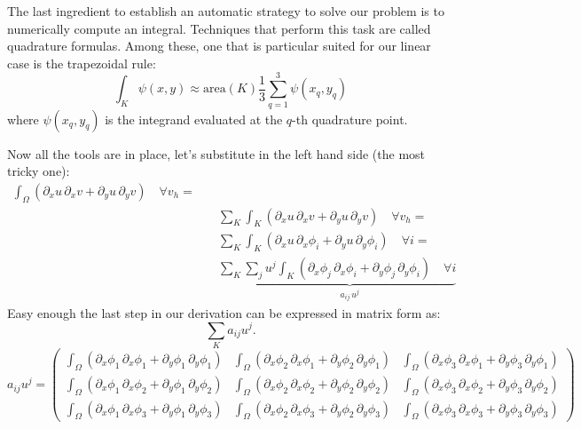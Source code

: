 \documentclass[11pt]{amsart}
\begin{document}
The last ingredient to establish an automatic strategy to solve our problem is 
to numerically compute an integral. 
Techniques that perform this task are called quadrature formulas. Among 
these, one that is particular suited for our linear case is the trapezoidal rule:
\[
\int_K \psi(x,y) \approx \mathrm{area}(K) \frac{1}{3}\sum_{q=1}^3\psi(x_q,y_q)
\]
where $\psi(x_q,y_q)$ is the integrand evaluated at the $q$-th quadrature point.

Now all the tools are in place, let's substitute in the left hand side (the most 
tricky one):
\[
\begin{split}
\int_\Omega \left(
\partial_x u\, \partial_x v + 
\partial_y u\, \partial_y v\right)\quad \forall v_h = \\
& \quad \sum_K \int_K \left(
\partial_x u\, \partial_x v + 
\partial_y u\, \partial_y v\right)\quad \forall v_h = \\
& \quad \sum_K \int_K \left(
\partial_x u\, \partial_x \phi_i + 
\partial_y u\, \partial_y \phi_i \right)\quad \forall i = \\
& \quad \sum_K \underbrace{\sum_j u^j  \int_K \left(
\partial_x \phi_j\, \partial_x \phi_i + 
\partial_y \phi_j\, \partial_y \phi_i \right)\quad \forall i}_{a_{ij} \, u^j}
\end{split}
\]
Easy enough the last step in our derivation can be expressed in matrix form as:
\[
\sum_K a_{ij} u^j.
\]
\[
a_{ij} u^j = 
\left(
\begin{array}{ccc}
\int_\Omega \left(
\partial_x \phi_1\, \partial_x \phi_1 + 
\partial_y \phi_1\, \partial_y \phi_1 \right) & 
\int_\Omega \left(
\partial_x \phi_2\, \partial_x \phi_1 + 
\partial_y \phi_2\, \partial_y \phi_1 \right) & 
\int_\Omega \left(
\partial_x \phi_3\, \partial_x \phi_1 + 
\partial_y \phi_3\, \partial_y \phi_1 \right)
\\
\int_\Omega \left(
\partial_x \phi_1\, \partial_x \phi_2 + 
\partial_y \phi_1\, \partial_y \phi_2 \right) & 
\int_\Omega \left(
\partial_x \phi_2\, \partial_x \phi_2 + 
\partial_y \phi_2\, \partial_y \phi_2 \right) & 
\int_\Omega \left(
\partial_x \phi_3\, \partial_x \phi_2 + 
\partial_y \phi_3\, \partial_y \phi_2 \right)\\
\int_\Omega \left(
\partial_x \phi_1\, \partial_x \phi_3 + 
\partial_y \phi_1\, \partial_y \phi_3 \right) & 
\int_\Omega \left(
\partial_x \phi_2\, \partial_x \phi_3 + 
\partial_y \phi_2\, \partial_y \phi_3 \right) & 
\int_\Omega \left(
\partial_x \phi_3\, \partial_x \phi_3 + 
\partial_y \phi_3\, \partial_y \phi_3 \right)
\end{array}
\right)
\]
\end{document}
